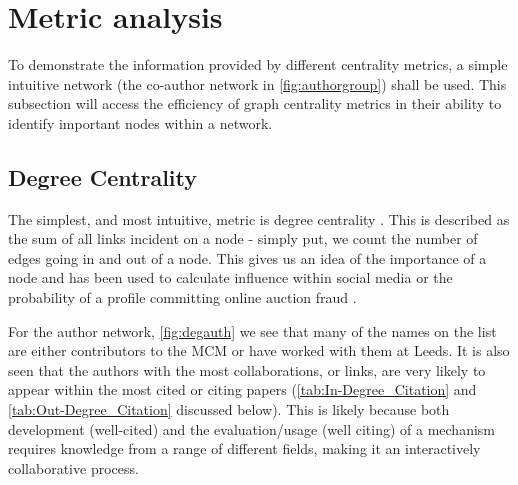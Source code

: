 \section{Metric analysis}\label{sec:graphcentrality}

To demonstrate the information provided by different centrality metrics, a simple intuitive network (the co-author network in \autoref{fig:authorgroup}) shall be used. This subsection will access the efficiency of graph centrality metrics in their ability to identify important nodes within a network. 


\subsection{Degree Centrality}
The simplest, and most intuitive, metric is degree centrality \citep{degreefreeman}. This is described as the sum of all links incident on a node - simply put, we count the number of edges going in and out of a node. This gives us an idea of the importance of a node and has been used to calculate influence within social media or the probability of a profile committing online auction fraud \citep{degreetwitter,degreefreeman}.

For the author network, \autoref{fig:degauth} we see that many of the names on the list are either contributors to the MCM or have worked with them at Leeds. It is also seen that the authors with the most collaborations, or links, are very likely to appear within the most cited or citing papers (\autoref{tab:In-Degree_Citation} and \autoref{tab:Out-Degree_Citation} discussed below). This is likely because both development (well-cited) and the evaluation/usage (well citing) of a mechanism requires knowledge from a range of different fields, making it an interactively collaborative process. 

